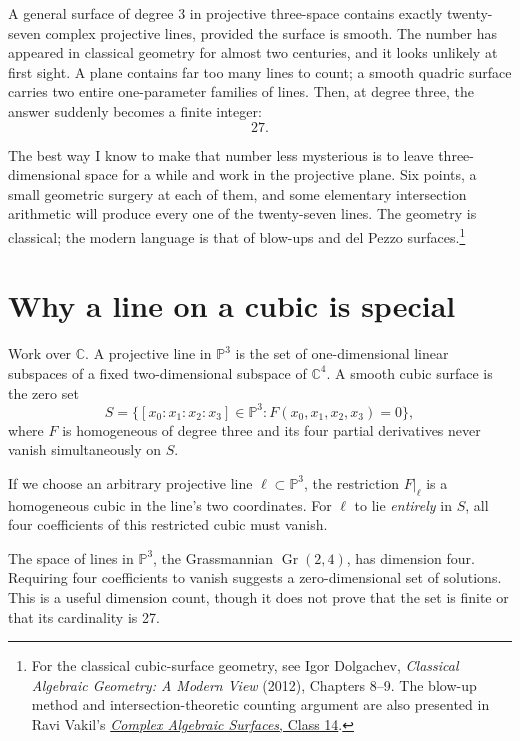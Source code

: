 
A general surface of degree \(3\) in projective three-space contains exactly twenty-seven complex projective lines, provided the surface is smooth. The number has appeared in classical geometry for almost two centuries, and it looks unlikely at first sight. A plane contains far too many lines to count; a smooth quadric surface carries two entire one-parameter families of lines. Then, at degree three, the answer suddenly becomes a finite integer:
\[
 \boxed{27}.
\]

The best way I know to make that number less mysterious is to leave three-dimensional space for a while and work in the projective plane. Six points, a small geometric surgery at each of them, and some elementary intersection arithmetic will produce every one of the twenty-seven lines. The geometry is classical; the modern language is that of blow-ups and del Pezzo surfaces.\footnote{For the classical cubic-surface geometry, see Igor Dolgachev, \emph{Classical Algebraic Geometry: A Modern View} (2012), Chapters 8--9. The blow-up method and intersection-theoretic counting argument are also presented in Ravi Vakil's \href{https://math.stanford.edu/~vakil/02-245/sclass14A.pdf}{\emph{Complex Algebraic Surfaces}, Class 14}.}

\section{Why a line on a cubic is special}

Work over \(\mathbb C\). A projective line in \(\mathbb P^3\) is the set of one-dimensional linear subspaces of a fixed two-dimensional subspace of \(\mathbb C^4\). A smooth cubic surface is the zero set
\[
 S=\{[x_0:x_1:x_2:x_3]\in\mathbb P^3:
       F(x_0,x_1,x_2,x_3)=0\},
\]
where \(F\) is homogeneous of degree three and its four partial derivatives never vanish simultaneously on \(S\).

If we choose an arbitrary projective line \(\ell\subset\mathbb P^3\), the restriction \(F|_\ell\) is a homogeneous cubic in the line's two coordinates. For \(\ell\) to lie \emph{entirely} in \(S\), all four coefficients of this restricted cubic must vanish.

The space of lines in \(\mathbb P^3\), the Grassmannian \(\operatorname{Gr}(2,4)\), has dimension four. Requiring four coefficients to vanish suggests a zero-dimensional set of solutions. This is a useful dimension count, though it does not prove that the set is finite or that its cardinality is 27.

